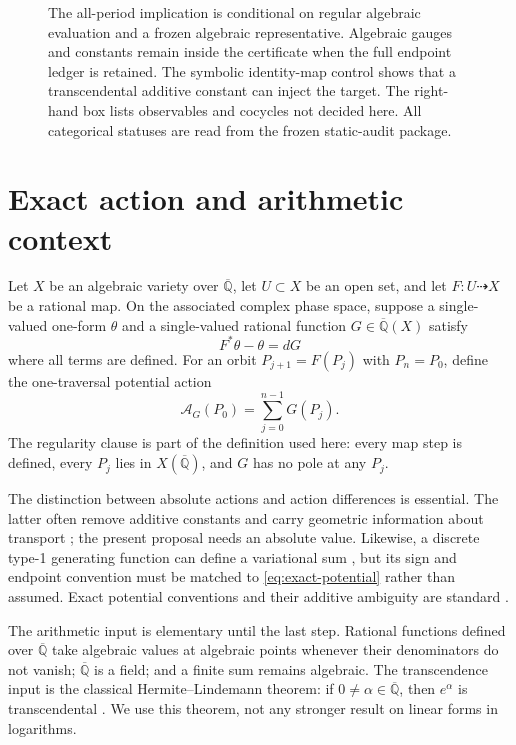\documentclass[11pt]{article}
\theoremstyle{definition}
\theoremstyle{remark}
\newcommand{\Qbar}{\overline{\mathbb Q}}
\newcommand{\Action}{\mathcal A}
\begin{document}
\begin{figure}[t]
  \centering
  \ActionCertificateFigure
  \caption{The all-period implication is conditional on regular algebraic
  evaluation and a frozen algebraic representative.  Algebraic gauges and
  constants remain inside the certificate when the full endpoint ledger is
  retained.  The symbolic identity-map control shows that a transcendental
  additive constant can inject the target.  The right-hand box lists
  observables and cocycles not decided here.  All categorical statuses are
  read from the frozen static-audit package.}
  \label{fig:action-certificate}
\end{figure}

\section{Exact action and arithmetic context}
\label{sec:context}

Let $X$ be an algebraic variety over $\Qbar$, let $U\subset X$ be an open
set, and let $F:U\dashrightarrow X$ be a rational map.  On the associated
complex phase space, suppose a single-valued one-form $\theta$ and a
single-valued rational function $G\in\Qbar(X)$ satisfy
\begin{equation}
  F^*\theta-\theta=dG
  \label{eq:exact-potential}
\end{equation}
where all terms are defined.  For an orbit
$P_{j+1}=F(P_j)$ with $P_n=P_0$, define the one-traversal potential action
\begin{equation}
  \Action_G(P_0)=\sum_{j=0}^{n-1}G(P_j).
  \label{eq:action-definition}
\end{equation}
The regularity clause is part of the definition used here: every map step is
defined, every $P_j$ lies in $X(\Qbar)$, and $G$ has no pole at any $P_j$.

The distinction between absolute actions and action differences is essential.
The latter often remove additive constants and carry geometric information
about transport \citep{mackay1984transport,meiss1992symplectic}; the present
proposal needs an absolute value.  Likewise, a discrete type-1 generating
function can define a variational sum \citep{kook1989periodic,
mazzucchelli2013degenerate,bialy2023locally}, but its sign and endpoint
convention must be matched to \eqref{eq:exact-potential} rather than assumed.
Exact potential conventions and their additive ambiguity are standard
\citep{delshams1997melnikov}.

The arithmetic input is elementary until the last step.  Rational functions
defined over $\Qbar$ take algebraic values at algebraic points whenever their
denominators do not vanish; $\Qbar$ is a field; and a finite sum remains
algebraic.  The transcendence input is the classical
Hermite--Lindemann theorem: if $0\ne\alpha\in\Qbar$, then $e^\alpha$ is
transcendental \citep{baker2022transcendental}.  We use this theorem, not any
stronger result on linear forms in logarithms.
\end{document}
